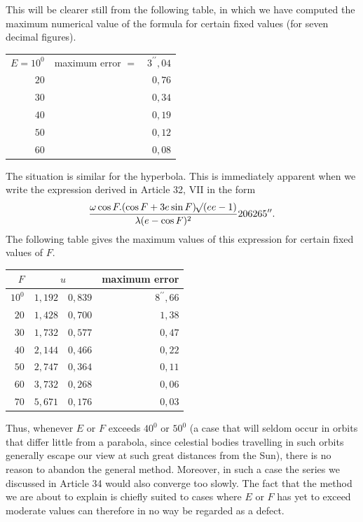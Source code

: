 This will be clearer still from the following table, in which we have computed the maximum numerical value of the formula for certain fixed values (for seven decimal figures).
\begin{center}
\begin{tabular}{r|lr}
$E=10^0$ & maximum error $=$ & $3^{\prime\prime}{,}04$\\
$20$ & & $0{,}76$\\
$30$ & & $0{,}34$\\
$40$ & & $0{,}19$\\
$50$ & & $0{,}12$\\
$60$ & & $0{,}08$
\end{tabular}
\end{center}
\noindent The situation is similar for the hyperbola. This is immediately apparent when we write the expression derived in Article 32, VII in the form
\[
\frac{\omega\cos F.(\cos F+3e\sin F)\mathord{{}^{}\!\surd}(ee-1)}{\lambda(e-\cos F)^2}206265^{\prime\prime}.
\]
The following table gives the maximum values of this expression for certain fixed values of $F$.
\begin{center}
\begin{tabular}{r|r|r|r}
\hline
$F$ & \multicolumn{2}{c|}{$u$} & maximum error\\
\hline
$10^0$ & $1{,}192$ & $0{,}839$ & $8^{\prime\prime}{,}66$\\
$20$ & $1{,}428$ & $0{,}700$ & $1{,}38$\\
$30$ & $1{,}732$ & $0{,}577$ & $0{,}47$\\
$40$ & $2{,}144$ & $0{,}466$ & $0{,}22$\\
$50$ & $2{,}747$ & $0{,}364$ & $0{,}11$\\
$60$ & $3{,}732$ & $0{,}268$ & $0{,}06$\\
$70$ & $5{,}671$ & $0{,}176$ & $0{,}03$
\end{tabular}
\end{center}
\noindent Thus, whenever $E$ or $F$ exceeds $40^0$ or $50^0$ (a case that will seldom occur in orbits that differ little from a parabola, since celestial bodies travelling in such orbits generally escape our view at such great distances from the Sun), there is no reason to abandon the general method. Moreover, in such a case the series we discussed in Article 34 would also converge too slowly. The fact that the method we are about to explain is chiefly suited to cases where $E$ or $F$ has yet to exceed moderate values can therefore in no way be regarded as a defect.
